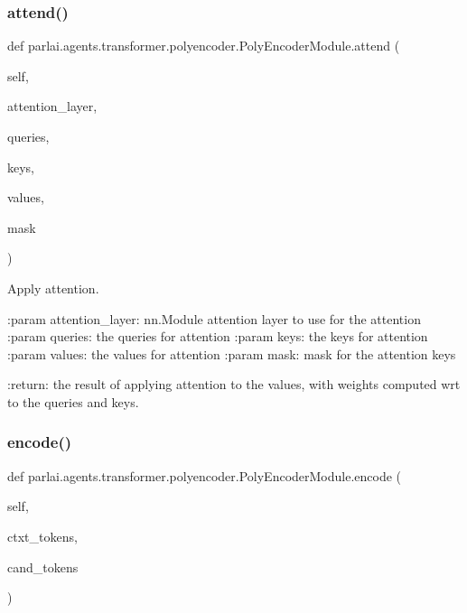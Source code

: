 \subsubsection{\texorpdfstring{attend()}{attend()}}
{\footnotesize\ttfamily def parlai.\+agents.\+transformer.\+polyencoder.\+Poly\+Encoder\+Module.\+attend (\begin{DoxyParamCaption}\item[{}]{self,  }\item[{}]{attention\+\_\+layer,  }\item[{}]{queries,  }\item[{}]{keys,  }\item[{}]{values,  }\item[{}]{mask }\end{DoxyParamCaption})}

\begin{DoxyVerb}Apply attention.

:param attention_layer:
    nn.Module attention layer to use for the attention
:param queries:
    the queries for attention
:param keys:
    the keys for attention
:param values:
    the values for attention
:param mask:
    mask for the attention keys

:return:
    the result of applying attention to the values, with weights computed
    wrt to the queries and keys.
\end{DoxyVerb}
 \mbox{\label{classparlai_1_1agents_1_1transformer_1_1polyencoder_1_1PolyEncoderModule_a54ca3cb24e2a0fbbfa7b3f145c7558ed}} 
\subsubsection{\texorpdfstring{encode()}{encode()}}
{\footnotesize\ttfamily def parlai.\+agents.\+transformer.\+polyencoder.\+Poly\+Encoder\+Module.\+encode (\begin{DoxyParamCaption}\item[{}]{self,  }\item[{}]{ctxt\+\_\+tokens,  }\item[{}]{cand\+\_\+tokens }\end{DoxyParamCaption})}

